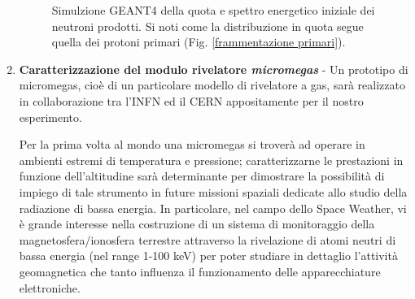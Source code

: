 \begin{enumerate}
\begin{figure}
    \caption{Simulzione GEANT4 della quota e spettro energetico iniziale dei neutroni prodotti. Si noti come la distribuzione in quota segue quella dei protoni primari (Fig. \ref{frammentazione primari}).}
    \label{Neutroni}
\end{figure}
    \item \textbf{Caratterizzazione del modulo rivelatore \emph{micromegas}} - Un prototipo di micromegas, cioè di un particolare modello di rivelatore a gas, sarà realizzato in collaborazione tra l'INFN ed il CERN appositamente per il nostro esperimento.

Per la prima volta al mondo una micromegas si troverà ad operare in ambienti estremi di temperatura e pressione; caratterizzarne le prestazioni in funzione dell'altitudine sarà determinante per dimostrare la possibilità di impiego di tale strumento in future missioni spaziali dedicate allo studio della radiazione di bassa energia. In particolare, nel campo dello Space Weather, vi è grande interesse nella costruzione di un sistema di monitoraggio della magnetosfera/ionosfera terrestre attraverso la rivelazione di atomi neutri di bassa energia (nel range 1-100 keV) per poter studiare in dettaglio l’attività geomagnetica che tanto influenza il funzionamento delle apparecchiature elettroniche.
\end{enumerate}
